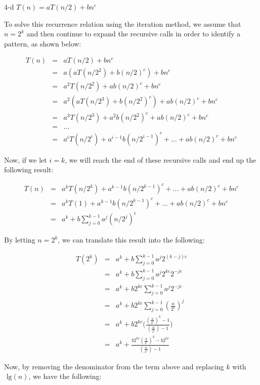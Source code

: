 \documentclass[11pt]{article}
\newcommand{\tlg}{\text{ lg}}
\begin{document}
\begin{prob}{4-d}
$T(n) = aT(n/2) + bn^{c}$
\end{prob}
\begin{sol} 

To solve this recurrence relation using the iteration method, we assume that $n = 2^k$ and then continue to expand the recursive calls in order to identify a pattern, as shown below:

\begin{eqnarray*}
T(n) & = & aT(n/2) + bn^c \\
& = & a(aT(n/2^2) + b(n/2)^c) + bn^c \\
& = & a^2T(n/2^2) + ab(n/2)^c + bn^c\\
& = & a^2(aT(n/2^3) + b(n/2^2)^c) + ab(n/2)^c + bn^c \\
& = & a^3T(n/2^3) + a^2b(n/2^2)^c + ab(n/2)^c + bn^c \\
& = & ... \\
& = & a^iT(n/2^i) + a^{i-1}b(n/2^{i-1})^c + ... + ab(n/2)^c + bn^c
\end{eqnarray*}

Now, if we let $i = k$, we will reach the end of these recursive calls and end up the following result:

\begin{eqnarray*}
T(n) & = & a^{k}T(n/2^k) + a^{k-1}b(n/2^{k-1})^c + ... + ab(n/2)^c + bn^c \\
& = & a^{k}T(1) + a^{k-1}b(n/2^{k-1})^c + ... + ab(n/2)^c + bn^c \\
& = & a^{k} + b\sum_{j=0}^{k-1} a^j(n/2^j)^c
\end{eqnarray*}

By letting $n=2^k$, we can translate this result into the following:

\begin{eqnarray*}
T(2^k) & = & a^{k} + b\sum_{j=0}^{k-1} a^j2^{(k-j)c} \\
& = & a^{k} + b\sum_{j=0}^{k-1} a^j2^{kc}2^{-jc} \\
& = & a^{k} + b2^{kc}\sum_{j=0}^{k-1} a^j2^{-jc} \\
& = & a^{k} + b2^{kc}\sum_{j=0}^{k-1} (\frac{a}{2^c})^j \\
& = & a^{k} + b2^{kc}\Bigg(\frac{(\frac{a}{2^c})^k - 1}{(\frac{a}{2^c}) - 1} \Bigg) \\
& = & a^{k} + \frac{b2^{kc}(\frac{a}{2^c})^k - b2^{kc}}{(\frac{a}{2^c}) - 1} 
\end{eqnarray*}

Now, by removing the denominator from the term above and replacing $k$ with $\tlg(n)$, we have the following:


\end{sol}
\end{document}
